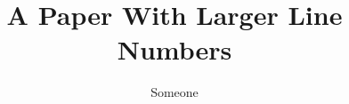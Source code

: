 \documentclass[10pt]{article}
\begin{document}
\title{A Paper With Larger Line Numbers}\author{Someone}\maketitle
\lipsum[1-12]
\end{document}
